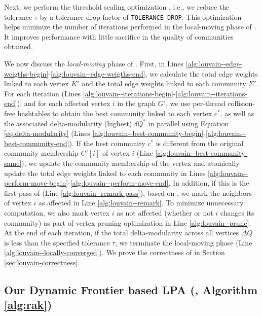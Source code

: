 Next, we perform the threshold scaling optimization \cite{com-naim17}, i.e., we reduce the tolerance $\tau$ by a tolerance drop factor of \verb|TOLERANCE_DROP|. This optimization helps minimize the number of iterations performed in the local-moving phase of \Lou{}. It improves performance with little sacrifice in the quality of communities obtained.

We now discuss the \textit{local-moving} phase of \Lou{}. First, in Lines \ref{alg:louvain--edge-weigths-begin}-\ref{alg:louvain--edge-weigths-end}, we calculate the total edge weights linked to each vertex $K'$ and the total edge weights linked to each community $\Sigma'$. For each iteration (Lines \ref{alg:louvain--iterations-begin}-\ref{alg:louvain--iterations-end}), and for each affected vertex $i$ in the graph $G'$, we use per-thread collision-free hashtables to obtain the best community linked to each vertex $c^*$, as well as the associated delta-modularity (highest) $\delta Q^*$ in parallel using Equation \ref{eq:delta-modularity} (Lines \ref{alg:louvain--best-community-begin}-\ref{alg:louvain--best-community-end}). If the best community $c^*$ is different from the original community membership $C'[i]$ of vertex $i$ (Line \ref{alg:louvain--best-community-same}), we update the community membership of the vertex and atomically update the total edge weights linked to each community in Lines \ref{alg:louvain--perform-move-begin}-\ref{alg:louvain--perform-move-end}. In addition, if this is the first pass of \Lou{} (Line \ref{alg:louvain--remark-pass}), based on \Fro{}, we mark the neighbors of vertex $i$ as affected in Line \ref{alg:louvain--remark}. To minimize unnecessary computation, we also mark vertex $i$ as not affected (whether or not $i$ changes its community) as part of vertex pruning optimization in Line \ref{alg:louvain--prune}. At the end of each iteration, if the total delta-modularity across all vertices $\Delta Q$ is less than the specified tolerance $\tau$, we terminate the local-moving phase (Line \ref{alg:louvain--locally-converged}). We prove the correctness of \FroLou{} in Section \ref{sec:louvain-correctness}.




\subsection{Our Dynamic Frontier based LPA (\FroLPA{}, Algorithm \ref{alg:rak})}
\label{sec:dynamic-rak}

